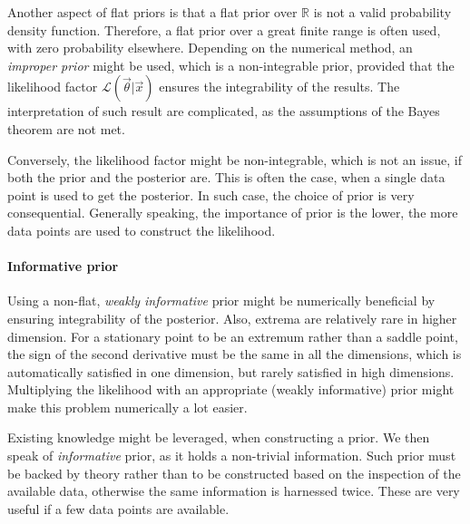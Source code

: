 Another aspect of flat priors is that a flat prior over $\mathbb{R}$ is not a valid probability density function. Therefore, a flat prior over a great finite range is often used, with zero probability elsewhere. Depending on the numerical method, an \textit{improper prior} might be used, which is a non-integrable prior, provided that the likelihood factor $\mathcal{L}(\vec{\theta}|\vec{x})$ ensures the integrability of the results. The interpretation of such result are complicated, as the assumptions of the Bayes theorem are not met. 

Conversely, the likelihood factor might be non-integrable, which is not an issue, if both the prior and the posterior are. This is often the case, when a single data point is used to get the posterior. In such case, the choice of prior is very consequential. Generally speaking, the importance of prior is the lower, the more data points are used to construct the likelihood.

\paragraph{Informative prior} Using a non-flat, \textit{weakly informative} prior might be numerically beneficial by ensuring integrability of the posterior. Also, extrema are relatively rare in higher dimension. For a stationary point to be an extremum rather than a saddle point, the sign of the second derivative must be the same in all the dimensions, which is automatically satisfied in one dimension, but rarely satisfied in high dimensions. Multiplying the likelihood with an appropriate (weakly informative) prior might make this problem numerically a lot easier. 

Existing knowledge might be leveraged, when constructing a prior. We then speak of \textit{informative} prior, as it holds a non-trivial information. Such prior must be backed by theory rather than to be constructed based on the inspection of the available data, otherwise the same information is harnessed twice. These are very useful if a few data points are available.










